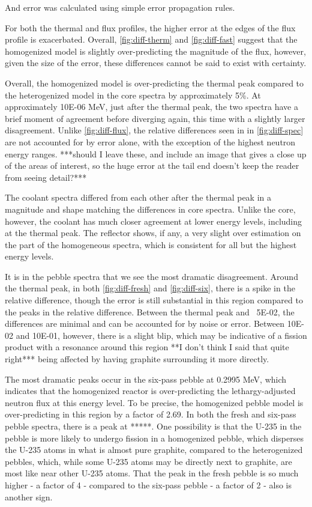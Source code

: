And error was calculated using simple error propagation rules.




For both the thermal and flux profiles, the higher error at the edges of the flux profile is exacerbated.  Overall, \ref{fig:diff-therm} and \ref{fig:diff-fast} suggest that the homogenized model is slightly over-predicting the magnitude of the flux, however, given the size of the error, these differences cannot be said to exist with certainty.




Overall, the homogenized model is over-predicting the thermal peak compared to the heterogenized model in the core spectra by approximately 5\%.  At approximately 10E-06 MeV, just after the thermal peak, the two spectra have a brief moment of agreement before diverging again, this time with a slightly larger disagreement.  Unlike \ref{fig:diff-flux}, the relative differences seen in in \ref{fig:diff-spec} are not accounted for by error alone, with the exception of the highest neutron energy ranges. ***should I leave these, and include an image that gives a close up of the areas of interest, so the huge error at the tail end doesn't keep the reader from seeing detail?***  

The coolant spectra differed from each other after the thermal peak in a magnitude and shape matching the differences in core spectra.  Unlike the core, however, the coolant has much closer agreement at lower energy levels, including at the thermal peak.  The reflector shows, if any, a very slight over estimation on the part of the homogeneous spectra, which is consistent for all but the highest energy levels.

It is in the pebble spectra that we see the most dramatic disagreement.  Around the thermal peak, in both \ref{fig:diff-fresh} and \ref{fig:diff-six}, there is a spike in the relative difference, though the error is still substantial in this region compared to the peaks in the relative difference.  Between the thermal peak and ~5E-02, the differences are minimal and can be accounted for by noise or error.  Between 10E-02 and 10E-01, however, there is a slight blip, which may be indicative of a fission product with a resonance around this region **I don't think I said that quite right*** being affected by having graphite surrounding it more directly.

The most dramatic peaks occur in the six-pass pebble at 0.2995 MeV, which indicates that the homogenized reactor is over-predicting the lethargy-adjusted neutron flux at this energy level.  To be precise, the homogenized pebble model is over-predicting in this region by a factor of 2.69.  In both the fresh and six-pass pebble spectra, there is a peak at *****.  One possibility is that the U-235 in the pebble is more likely to undergo fission in a homogenized pebble, which disperses the U-235 atoms in what is almost pure graphite, compared to the heterogenized pebbles, which, while some U-235 atoms may be directly next to graphite, are most like near other U-235 atoms.  That the peak in the fresh pebble is so much higher - a factor of 4 - compared to the six-pass pebble - a factor of 2 - also is another sign.



